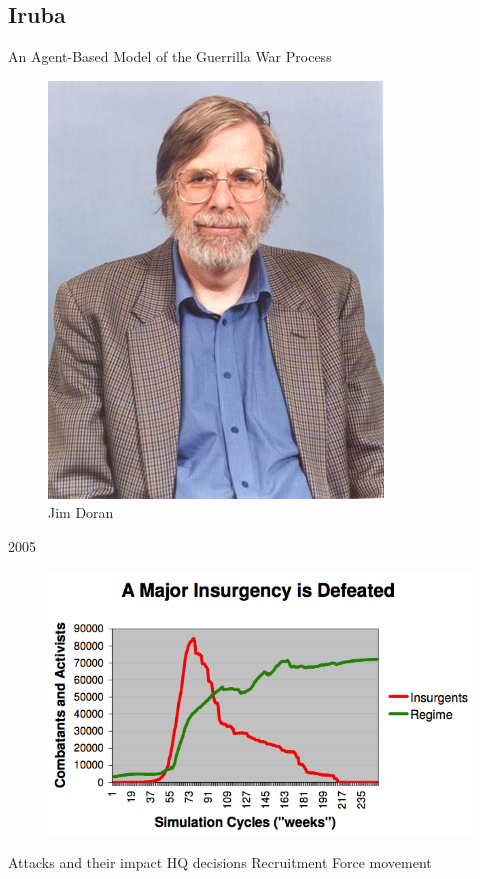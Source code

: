 \documentclass{article}
\begin{document}
\subsection{Iruba}
An Agent-Based Model of the Guerrilla War Process
\begin{figure}[H]
	\begin{centering}
	\includegraphics[]{../ressources/doran}
	\caption{Jim Doran}
	\end{centering}
\end{figure}
2005
\begin{figure}[H]
	\begin{centering}
	\includegraphics[width=\linewidth]{../ressources/insurgency}
	\caption{}
	\end{centering}
\end{figure}
\begin{algorithmic}[1]
			\STATE Attacks and their impact
			\STATE HQ decisions
			\STATE Recruitment
			\STATE Force movement
		\ENDWHILE
		\end{algorithmic}
\cite{doran2005iruba}
\end{document}
